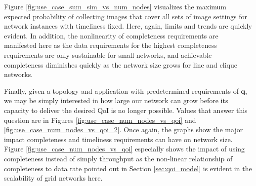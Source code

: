 Figure \ref{fig:use_case_sum_sim_vs_num_nodes} visualizes the maximum expected probability of collecting images that cover all sets of image settings for network instances with timeliness fixed.  Here, again, limits and trends are quickly evident.  In addition, the nonlinearity of completeness requirements are manifested here as the data requirements for the highest completeness requirements are only sustainable for small networks, and achievable completeness diminishes quickly as the network size grows for line and clique networks.  


Finally, given a topology and application with predetermined requirements of $\mathbf{q}$, we may be simply interested in how large our network can grow before its capacity to deliver the desired QoI is no longer possible.  Values that answer this question are in Figures \ref{fig:use_case_num_nodes_vs_qoi} and \ref{fig:use_case_num_nodes_vs_qoi_2}.  Once again, the graphs show the major impact completeness and timeliness requirements can have on network size.  Figure \ref{fig:use_case_num_nodes_vs_qoi} especially shows the impact of using completeness instead of simply throughput as the non-linear relationship of completeness to data rate pointed out in Section \ref{sec:qoi_model} is evident in the scalability of grid networks here.



